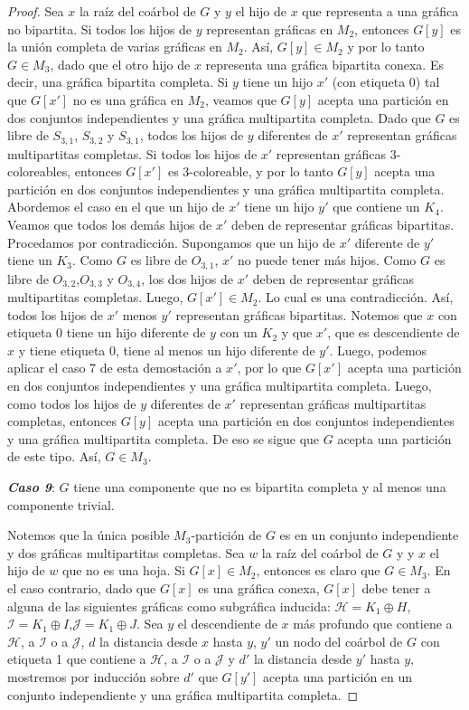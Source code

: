 \begin{proof}
Sea $x$ la raíz del coárbol de $G$ y $y$ el hijo de $x$ que representa a una gráfica no bipartita. Si todos los hijos de $y$ representan gráficas en $M_2$, entonces $G[y]$ es la unión completa de varias gráficas en $M_2$. Así, $G[y]\in M_2$ y por lo tanto $G\in M_3$, dado que el otro hijo de $x$ representa una gráfica bipartita conexa. Es decir, una gráfica bipartita completa. Si $y$ tiene un hijo $x'$ (con etiqueta 0) tal que $G[x']$ no es una gráfica en $M_2$, veamos que $G[y]$ acepta una partición en dos conjuntos independientes y una gráfica multipartita completa. Dado que $G$ es libre de $S_{3,1}$, $S_{3,2}$ y $S_{3,1}$, todos los hijos de $y$ diferentes de $x'$ representan gráficas multipartitas completas. Si todos los hijos de $x'$ representan gráficas 3-coloreables, entonces $G[x']$ es 3-coloreable, y por lo tanto $G[y]$ acepta una partición en dos conjuntos independientes y una gráfica multipartita completa. Abordemos el caso en el que un hijo de $x'$ tiene un hijo $y'$ que contiene un $K_4$. Veamos que todos los demás hijos de $x'$ deben de representar gráficas bipartitas. Procedamos por contradicción. Supongamos que un hijo de $x'$ diferente de $y'$ tiene un $K_3$. Como $G$ es libre de $O_{3,1}$, $x'$ no puede tener más hijos. Como $G$ es libre de  $O_{3,2}$,$O_{3,3}$ y $O_{3,4}$, los dos hijos de $x'$ deben de representar gráficas multipartitas completas. Luego, $G[x']\in M_2$. Lo cual es una contradicción. Así, todos los hijos de $x'$ menos $y'$ representan gráficas bipartitas. Notemos que $x$ con etiqueta 0 tiene un hijo diferente de $y$ con un $K_2$ y que $x'$, que es descendiente de $x$ y tiene etiqueta 0, tiene al menos un hijo diferente de $y'$. Luego, podemos aplicar el caso 7 de esta demostación a $x'$, por lo que $G[x']$ acepta una partición en dos conjuntos independientes y una gráfica multipartita completa. Luego, como todos los hijos de $y$ diferentes de $x'$ representan gráficas multipartitas completas, entonces $G[y]$ acepta una partición en dos conjuntos independientes y una gráfica multipartita completa. De eso se sigue que $G$ acepta una partición de este tipo. Así, $G\in M_3$.

\emph{\textbf{Caso 9}}: $G$ tiene una componente que no es bipartita completa y al menos una componente trivial.

Notemos que la única posible $M_3$-partición de $G$ es en un conjunto independiente y dos gráficas multipartitas completas. Sea $w$ la raíz del coárbol de $G$ y y $x$ el hijo de $w$ que no es una hoja. Si $G[x]\in M_2$, entonces es claro que $G\in M_3$. En el caso contrario, dado que $G[x]$ es una gráfica conexa, $G[x]$ debe tener a alguna de las siguientes gráficas como subgráfica inducida: $\mathcal{H}=K_1\oplus H$,$\mathcal{I}=K_1\oplus I$,$\mathcal{J}=K_1\oplus J$. Sea $y$ el descendiente de $x$ más profundo que contiene a $\mathcal{H}$, a $\mathcal{I}$ o a $\mathcal{J}$, $d$ la distancia desde $x$ hasta $y$, $y'$ un nodo del coárbol de $G$ con etiqueta 1 que contiene a $\mathcal{H}$, a $\mathcal{I}$ o a $\mathcal{J}$ y $d'$ la distancia desde $y'$ hasta $y$, mostremos por inducción sobre $d'$ que $G[y']$ acepta una partición en un conjunto independiente y una gráfica multipartita completa.


\end{proof}
